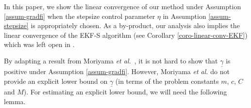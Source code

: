 \documentclass[final,numbook]{svjour3}
\begin{document}
In this paper, we show the linear convergence of our method under Assumption \ref{assum-gradfi} when the stepsize control parameter $\eta$ in Assumption \ref{assum-stepsize} is appropriately chosen. As a by-product, our analysis also implies the linear convergence of the EKF-S algorithm (see Corollary \ref{coro-linear-conv-EKF}) which was left open in \cite[\S 7]{AlgEkfs2003}.

By adapting a result from Moriyama \textit{et al.}~\cite[Theorem 4.2]{AlgEkfs2003}, it is not hard to show that ${{\underline{\gamma}}}$ is positive under Assumption \ref{assum-gradfi}. However, Moriyama \textit{et al.} do not provide an explicit lower bound on ${{\underline{\gamma}}}$ (in terms of the problem constants $m$, $c$, $C$ and $M$). For estimating an explicit lower bound, we will need the following lemma.
 
\end{document}
